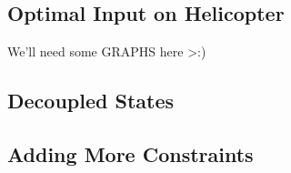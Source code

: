 \subsection{Optimal Input on Helicopter}
We'll need some GRAPHS here >:)

\subsection{Decoupled States}

\subsection{Adding More Constraints}



